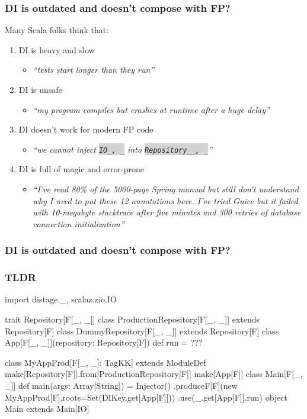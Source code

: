 \documentclass[usenames,dvipsnames]{beamer}
\newcommand{\code}[1]{\colorbox{lightgray}{\texttt{#1}}}
\begin{document}
\begin{frame}
\frametitle{DI is outdated and doesn't compose with FP?}
  Many Scala folks think that:
  \begin{enumerate}
  \item DI is heavy and slow
  \begin{itemize}
    \item \textit{``tests start longer than they run''}
  \end{itemize}
  \item DI is unsafe
  \begin{itemize}
    \item \textit{``my program compiles but crashes at runtime after a huge delay''}
  \end{itemize}
  \item DI doesn't work for modern FP code
  \begin{itemize}
    \item \textit{``we cannot inject \code{IO\lbrack\_, \_\rbrack} into \code{Repository\lbrack\_\lbrack\_, \_\rbrack\rbrack}''}
  \end{itemize}
  \item DI is full of magic and error-prone
  \begin{itemize}
    \item \textit{``I've read 80\% of the 5000-page Spring manual but still don't understand why I need to put these 12 annotations here.
    I've tried Guice but it failed with 10-megabyte stacktrace after five minutes and 300 retries of database connection initialization''}
  \end{itemize}
  \end{enumerate}
\end{frame}

\begin{frame}
\frametitle{DI is outdated and doesn't compose with FP?}
  \newline
\end{frame}

\begin{frame}[fragile]
\frametitle{TLDR}
  \begin{scalacode}
import distage._, scalaz.zio.IO

trait Repository[F[_, _]]
class ProductionRepository[F[_, _]] extends Repository[F]
class DummyRepository[F[_, _]] extends Repository[F]
class App[F[_, _]](repository: Repository[F]) { def run = ??? }

class MyAppProd[F[_, _]: TagKK] extends ModuleDef {
  make[Repository[F]].from[ProductionRepository[F]]
  make[App[F]]
}
class Main[F[_, _]] { def main(args: Array[String]) = 
  Injector()
    .produceF[F](new MyAppProd[F],roots=Set(DIKey.get[App[F]]))
    .use(_.get[App[F]].run)
}
object Main extends Main[IO]
  \end{scalacode}
\end{frame}
\end{document}
